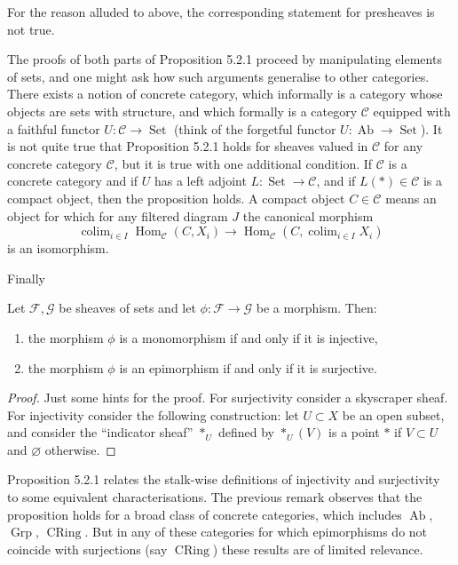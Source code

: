 For the reason alluded to above, the corresponding statement for presheaves is not true.

\begin{remark}
The proofs of both parts of Proposition 5.2.1 proceed by manipulating
elements of sets, and one might ask how such arguments generalise to other categories. There
exists a notion of concrete category, which informally is a category whose objects are sets with
structure, and which formally is a category $\mathcal C$ equipped with a faithful functor $U:\mathcal C\to\operatorname{Set}$
(think of the forgetful functor $U:\operatorname{Ab}\to\operatorname{Set}$). It is not quite true that Proposition 5.2.1
holds for sheaves valued in $\mathcal C$ for any concrete category $\mathcal C$, but it is true with one additional
condition. If $\mathcal C$ is a concrete category and if $U$ has a left adjoint $L:\operatorname{Set}\to\mathcal C$, and if $L(*)\in\mathcal C$
is a compact object, then the proposition holds. A compact object $C\in\mathcal C$ means an object
for which for any filtered diagram $J$ the canonical morphism
\[
\operatorname{colim}_{i\in I}\operatorname{Hom}_{\mathcal C}(C,X_i)
\to
\operatorname{Hom}_{\mathcal C}\left(C,\operatorname{colim}_{i\in I}X_i\right)
\]
is an isomorphism.
\end{remark}

Finally

\begin{proposition}
Let $\mathcal F,\mathcal G$ be sheaves of sets and let $\phi:\mathcal F\to\mathcal G$ be a morphism. Then:
\begin{enumerate}
\item the morphism $\phi$ is a monomorphism if and only if it is injective,
\item the morphism $\phi$ is an epimorphism if and only if it is surjective.
\end{enumerate}
\end{proposition}

\begin{proof}
Just some hints for the proof. For surjectivity consider a skyscraper sheaf. For
injectivity consider the following construction: let $U\subset X$ be an open subset, and consider
the “indicator sheaf” $*_U$ defined by $*_U(V)$ is a point $*$ if $V\subset U$ and $\varnothing$ otherwise.
\end{proof}

\begin{remark}
Proposition 5.2.1 relates the stalk-wise definitions of injectivity and surjectivity
to some equivalent characterisations. The previous remark observes that the proposition
holds for a broad class of concrete categories, which includes $\operatorname{Ab}$, $\operatorname{Grp}$, $\operatorname{CRing}$. But in
any of these categories for which epimorphisms do not coincide with surjections (say $\operatorname{CRing}$)
these results are of limited relevance.
\end{remark}

